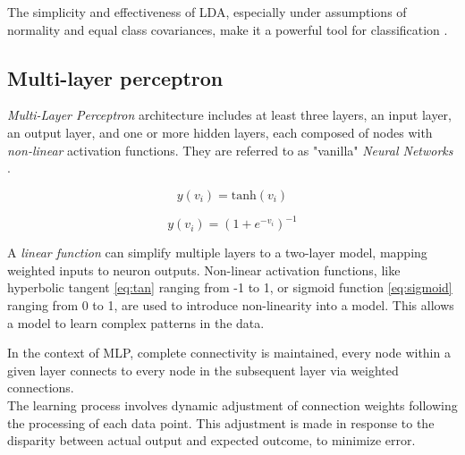             The simplicity and effectiveness of LDA, especially under assumptions of normality and equal class covariances, make it a powerful tool for classification \cite{balakrishnama_linear_nodate}.

        \subsection{Multi-layer perceptron}
            \textit{Multi-Layer Perceptron} architecture includes at least three layers, an input layer, an output layer, and one or more hidden layers, each composed of nodes with \textit{non-linear} activation functions\cite{svozil_introduction_1997}. They are referred to as "vanilla" \textit{Neural Networks} \cite{hastie_elements_2009}.

        \begin{equation}\label{eq:tan}
            y(v_i) = \text{tanh}(v_i) 
        \end{equation}

        \begin{equation}\label{eq:sigmoid}
            y(v_i) = (1+e^{-v_i})^{-1} 
        \end{equation}

            A \textit{linear function} can simplify multiple layers to a two-layer model, mapping weighted inputs to neuron outputs. Non-linear activation functions, like hyperbolic tangent \ref{eq:tan} ranging from -1 to 1, or sigmoid function \ref{eq:sigmoid} ranging from 0 to 1, are used to introduce non-linearity into a model. This allows a model to learn complex patterns in the data.

        \newpage

        In the context of MLP, complete connectivity is maintained, every node within a given layer connects to every node in the subsequent layer via weighted connections. \\
        The learning process involves dynamic adjustment of connection weights following the processing of each data point. This adjustment is made in response to the disparity between actual output and expected outcome, to minimize error.

